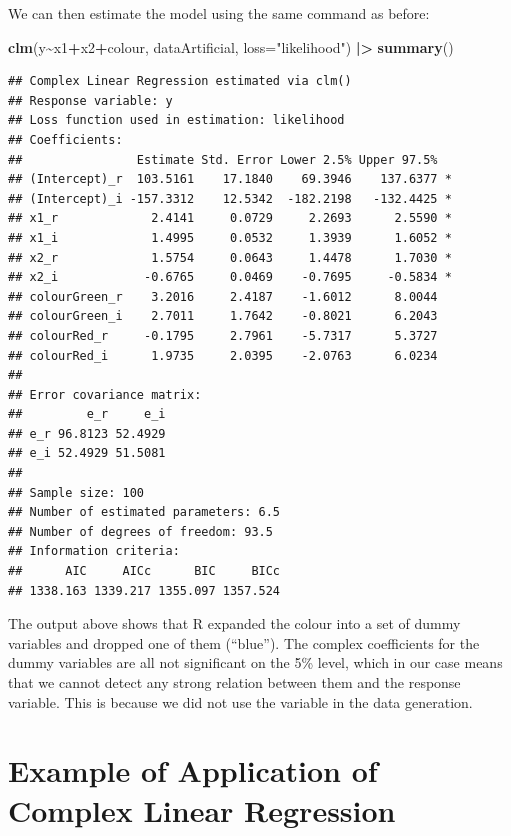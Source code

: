 \documentclass[
]{book}
\newenvironment{Shaded}{\begin{snugshade}}{\end{snugshade}}
\newcommand{\DataTypeTok}[1]{\textcolor[rgb]{0.13,0.29,0.53}{#1}}
\newcommand{\ErrorTok}[1]{\textcolor[rgb]{0.64,0.00,0.00}{\textbf{#1}}}
\newcommand{\KeywordTok}[1]{\textcolor[rgb]{0.13,0.29,0.53}{\textbf{#1}}}
\newcommand{\NormalTok}[1]{#1}
\newcommand{\OperatorTok}[1]{\textcolor[rgb]{0.81,0.36,0.00}{\textbf{#1}}}
\newcommand{\StringTok}[1]{\textcolor[rgb]{0.31,0.60,0.02}{#1}}
\begin{document}
We can then estimate the model using the same command as before:

\begin{Shaded}
\begin{Highlighting}[]
\KeywordTok{clm}\NormalTok{(y}\OperatorTok{\textasciitilde{}}\NormalTok{x1}\OperatorTok{+}\NormalTok{x2}\OperatorTok{+}\NormalTok{colour, dataArtificial, }\DataTypeTok{loss=}\StringTok{"likelihood"}\NormalTok{) }\OperatorTok{|}\ErrorTok{\textgreater{}}
\StringTok{    }\KeywordTok{summary}\NormalTok{()}
\end{Highlighting}
\end{Shaded}

\begin{verbatim}
## Complex Linear Regression estimated via clm()
## Response variable: y
## Loss function used in estimation: likelihood
## Coefficients:
##                Estimate Std. Error Lower 2.5% Upper 97.5%  
## (Intercept)_r  103.5161    17.1840    69.3946    137.6377 *
## (Intercept)_i -157.3312    12.5342  -182.2198   -132.4425 *
## x1_r             2.4141     0.0729     2.2693      2.5590 *
## x1_i             1.4995     0.0532     1.3939      1.6052 *
## x2_r             1.5754     0.0643     1.4478      1.7030 *
## x2_i            -0.6765     0.0469    -0.7695     -0.5834 *
## colourGreen_r    3.2016     2.4187    -1.6012      8.0044  
## colourGreen_i    2.7011     1.7642    -0.8021      6.2043  
## colourRed_r     -0.1795     2.7961    -5.7317      5.3727  
## colourRed_i      1.9735     2.0395    -2.0763      6.0234  
## 
## Error covariance matrix:
##         e_r     e_i
## e_r 96.8123 52.4929
## e_i 52.4929 51.5081
## 
## Sample size: 100
## Number of estimated parameters: 6.5
## Number of degrees of freedom: 93.5
## Information criteria:
##      AIC     AICc      BIC     BICc 
## 1338.163 1339.217 1355.097 1357.524
\end{verbatim}

The output above shows that R expanded the colour into a set of dummy variables and dropped one of them (``blue''). The complex coefficients for the dummy variables are all not significant on the 5\% level, which in our case means that we cannot detect any strong relation between them and the response variable. This is because we did not use the variable in the data generation.

\hypertarget{example-of-application-of-complex-linear-regression}{%
\section{Example of Application of Complex Linear Regression}\label{example-of-application-of-complex-linear-regression}}
\end{document}
